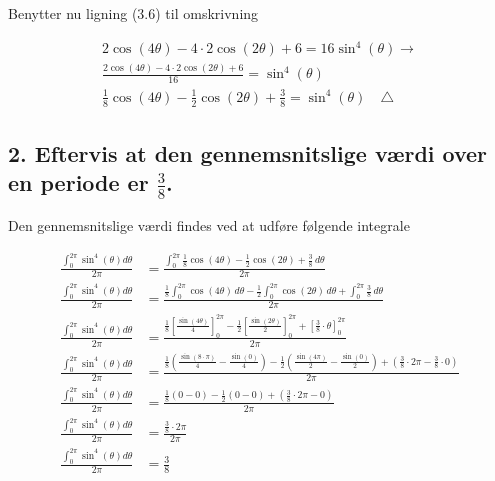\documentclass[a4paper, 12pt]{article}
\begin{document}
Benytter nu ligning (3.6) til omskrivning

\begin{align*}
    2 \cos(4 \theta) - 4 \cdot 2 \cos(2\theta) + 6 = 16 \sin^4(\theta) \to \\
    \frac{2 \cos(4 \theta) - 4 \cdot 2 \cos(2\theta) + 6}{16} = \sin^4(\theta) \\
    \frac{1}{8} \cos(4 \theta) - \frac{1}{2} \cos(2\theta) + \frac{3}{8} = \sin^4(\theta) \quad \triangle
\end{align*}

\subsection*{2. Eftervis at den gennemsnitslige værdi over en periode er \(\frac{3}{8}\).}
\label{sec:orgf9061d0}

Den gennemsnitslige værdi findes ved at udføre følgende integrale

\begin{align*}
    \frac{\int_0^{2 \pi} \sin^4(\theta) d \theta}{2 \pi} &= \frac{\int_0^{2 \pi} \frac{1}{8} \cos(4 \theta) - \frac{1}{2} \cos(2\theta) + \frac{3}{8} \, d \theta}{2 \pi} \\
    \frac{\int_0^{2 \pi} \sin^4(\theta) d \theta}{2 \pi} &= \frac{\frac{1}{8}\int_0^{2 \pi}  \cos(4 \theta)\, d \theta  - \frac{1}{2}\int_0^{2 \pi}  \cos(2\theta)\, d \theta + \int_0^{2 \pi} \frac{3}{8} \, d \theta}{2 \pi} \\
    \frac{\int_0^{2 \pi} \sin^4(\theta) d \theta}{2 \pi} &= \frac{\frac{1}{8}\left[\frac{\sin(4\theta)}{4}\right]_0^{2 \pi} - \frac{1}{2}\left[  \frac{\sin(2\theta)}{2}\right]_0^{2 \pi} + \left[\frac{3}{8}\cdot \theta\right]_0^{2\pi}}{2\pi} \\
    \frac{\int_0^{2 \pi} \sin^4(\theta) d \theta}{2 \pi} &= \frac{\frac{1}{8}\left(\frac{\sin(8\cdot \pi)}{4}- \frac{\sin(0)}{4}\right) - \frac{1}{2}\left(  \frac{\sin(4\pi)}{2}-\frac{\sin(0)}{2}\right) + \left(\frac{3}{8}\cdot 2 \pi-\frac{3}{8}\cdot 0\right)}{2\pi} \\
    \frac{\int_0^{2 \pi} \sin^4(\theta) d \theta}{2 \pi} &= \frac{\frac{1}{8}\left(0-0 \right) - \frac{1}{2}\left(  0-0\right) + \left(\frac{3}{8}\cdot 2 \pi- 0\right)}{2\pi} \\
    \frac{\int_0^{2 \pi} \sin^4(\theta) d \theta}{2 \pi} &= \frac{\frac{3}{8} \cdot 2 \pi}{2 \pi} \\
    \frac{\int_0^{2 \pi} \sin^4(\theta) d \theta}{2 \pi} &= \frac{3}{8}  
\end{align*}
\end{document}
